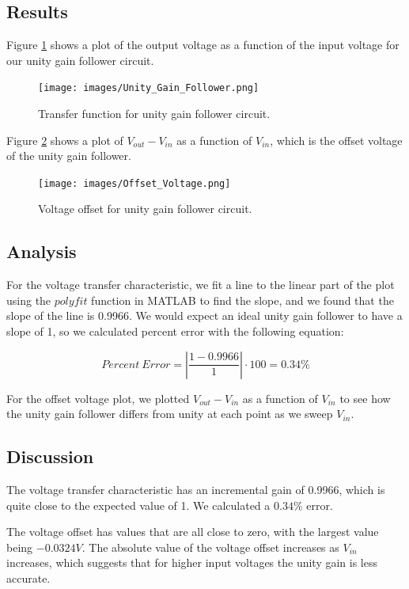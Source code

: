\documentclass{article}
\begin{document}
\subsection{Results}

Figure \ref{fig:unity_gain_follower} shows a plot of the output voltage as a function of the input voltage for our unity gain follower circuit.

\begin{figure}[H]
  \begin{center}      
  \texttt{[image: images/Unity\_Gain\_Follower.png]}
  \caption{Transfer function for unity gain follower circuit.}   
  \label{fig:unity_gain_follower}
  \end{center}
\end{figure}

Figure \ref{fig:offset_voltage} shows a plot of $V_{out} - V_{in}$ as a function of $V_{in}$, which is the offset voltage of the unity gain follower.

\begin{figure}[H]
  \begin{center}      
  \texttt{[image: images/Offset\_Voltage.png]}
  \caption{Voltage offset for unity gain follower circuit.}   
  \label{fig:offset_voltage}
  \end{center}
\end{figure}

\subsection{Analysis}

For the voltage transfer characteristic, we fit a line to the linear part of the plot using the $polyfit$ function in MATLAB to find the slope, and we found that the slope of the line is 0.9966. We would expect an ideal unity gain follower to have a slope of 1, so we calculated percent error with the following equation:

\begin{center}
    $$Percent \ Error = |\frac{1 - 0.9966}{1}| \cdot 100 = 0.34\%$$
\end{center}

For the offset voltage plot, we plotted $V_{out} - V_{in}$ as a function of $V_{in}$ to see how the unity gain follower differs from unity at each point as we sweep $V_{in}$.

\subsection{Discussion}

The voltage transfer characteristic has an incremental gain of 0.9966, which is quite close to the expected value of 1. We calculated a $0.34\%$ error.

The voltage offset has values that are all close to zero, with the largest value being $-0.0324 V$. The absolute value of the voltage offset increases as $V_{in}$ increases, which suggests that for higher input voltages the unity gain is less accurate. 
\end{document}
